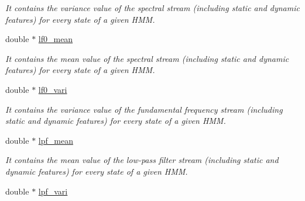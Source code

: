 \begin{DoxyCompactItemize}
\begin{DoxyCompactList}\small\item\em It contains the variance value of the spectral stream (including static and dynamic features) for every state of a given H\-M\-M. \end{DoxyCompactList}\item 
\hypertarget{class_m_a_g_e_1_1_model_memory_a5185a150edaa92b0a80a338a22221aa0}{double $\ast$ \hyperlink{class_m_a_g_e_1_1_model_memory_a5185a150edaa92b0a80a338a22221aa0}{lf0\-\_\-mean}}\label{class_m_a_g_e_1_1_model_memory_a5185a150edaa92b0a80a338a22221aa0}

\begin{DoxyCompactList}\small\item\em It contains the mean value of the spectral stream (including static and dynamic features) for every state of a given H\-M\-M. \end{DoxyCompactList}\item 
\hypertarget{class_m_a_g_e_1_1_model_memory_ae65fab1d3ffa0c6a63ad69be3ef383c6}{double $\ast$ \hyperlink{class_m_a_g_e_1_1_model_memory_ae65fab1d3ffa0c6a63ad69be3ef383c6}{lf0\-\_\-vari}}\label{class_m_a_g_e_1_1_model_memory_ae65fab1d3ffa0c6a63ad69be3ef383c6}

\begin{DoxyCompactList}\small\item\em It contains the variance value of the fundamental frequency stream (including static and dynamic features) for every state of a given H\-M\-M. \end{DoxyCompactList}\item 
\hypertarget{class_m_a_g_e_1_1_model_memory_aa3462aa5c781ecb1f5ebc2b4365d8f0e}{double $\ast$ \hyperlink{class_m_a_g_e_1_1_model_memory_aa3462aa5c781ecb1f5ebc2b4365d8f0e}{lpf\-\_\-mean}}\label{class_m_a_g_e_1_1_model_memory_aa3462aa5c781ecb1f5ebc2b4365d8f0e}

\begin{DoxyCompactList}\small\item\em It contains the mean value of the low-\/pass filter stream (including static and dynamic features) for every state of a given H\-M\-M. \end{DoxyCompactList}\item 
\hypertarget{class_m_a_g_e_1_1_model_memory_a9928940a2732079e59805df9af7e7684}{double $\ast$ \hyperlink{class_m_a_g_e_1_1_model_memory_a9928940a2732079e59805df9af7e7684}{lpf\-\_\-vari}}\label{class_m_a_g_e_1_1_model_memory_a9928940a2732079e59805df9af7e7684}


\end{DoxyCompactItemize}
